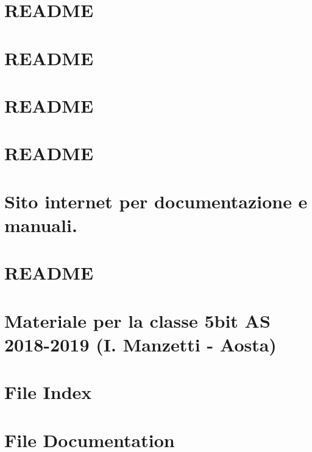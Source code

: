 \documentclass[twoside]{book}
\newcommand{\+}{\discretionary{\mbox{\scriptsize$\hookleftarrow$}}{}{}}
\newcommand{\clearemptydoublepage}{%
  \newpage{\pagestyle{empty}\cleardoublepage}%
}
\begin{document}
\chapter{R\+E\+A\+D\+ME}
\label{md_manuali_sito_etc_README}

\chapter{R\+E\+A\+D\+ME}
\label{md_manuali_sito_images_README}

\chapter{R\+E\+A\+D\+ME}
\label{md_manuali_sito_js_README}

\chapter{R\+E\+A\+D\+ME}
\label{md_manuali_sito_lib_README}

\chapter{Sito internet per documentazione e manuali.}
\label{md_manuali_sito_README}

\chapter{R\+E\+A\+D\+ME}
\label{md_manuali_sito_sub_README}

\chapter{Materiale per la classe 5bit AS 2018-\/2019 (I. Manzetti -\/ Aosta)}
\label{md_README}

\chapter{File Index}

\chapter{File Documentation}
















\backmatter
\newpage
{}
\clearemptydoublepage
{}
\printindex
\end{document}

